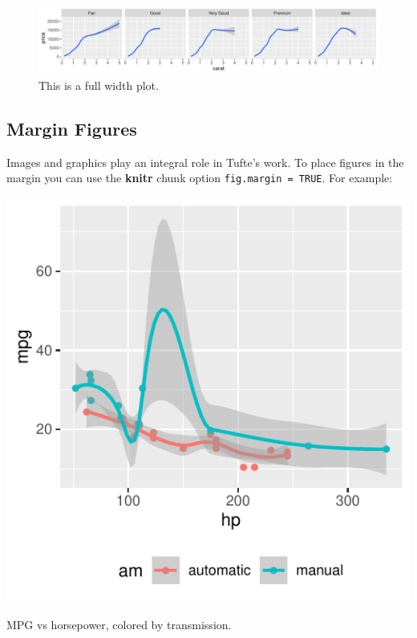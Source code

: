 \documentclass[]{tufte-handout}
\begin{document}
\begin{figure}
\includegraphics{CPPXHBSN-Comparison_files/figure-latex/fig-fullwidth-1} \caption[This is a full width plot]{This is a full width plot.}\label{fig:fig-fullwidth}
\end{figure}

\hypertarget{margin-figures}{%
\subsection{Margin Figures}\label{margin-figures}}

Images and graphics play an integral role in Tufte's work. To place
figures in the margin you can use the \textbf{knitr} chunk option
\texttt{fig.margin\ =\ TRUE}. For example:

\begin{marginfigure}
\includegraphics{CPPXHBSN-Comparison_files/figure-latex/fig-margin-1} \caption[MPG vs horsepower, colored by transmission]{MPG vs horsepower, colored by transmission.}\label{fig:fig-margin}
\end{marginfigure}
\end{document}
